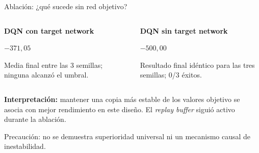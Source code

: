 \documentclass[aspectratio=169,10pt,t]{beamer}
\begin{document}
\begin{frame}{Ablación: ¿qué sucede sin red objetivo?}
\begin{columns}[T,onlytextwidth]
\begin{info}
\textbf{DQN con target network}\par\vspace{.13cm}
{\centering\color{Blue}\fontsize{27}{30}\selectfont\bfseries $-371{,}05$\par}
\vspace{.06cm}
\small Media final entre las 3 semillas; ninguna alcanzó el umbral.
\end{info}
\begin{info}
\textbf{DQN sin target network}\par\vspace{.13cm}
{\centering\color{Warn}\fontsize{27}{30}\selectfont\bfseries $-500{,}00$\par}
\vspace{.06cm}
\small Resultado final idéntico para las tres semillas; 0/3 éxitos.
\end{info}
\end{columns}
\vspace{.15cm}
\begin{takeaway}
\textbf{Interpretación:} mantener una copia más estable de los valores objetivo se asocia con mejor rendimiento en este diseño. El \emph{replay buffer} siguió activo durante la ablación.
\end{takeaway}
\vspace{.09cm}
{\footnotesize\color{Muted} Precaución: no se demuestra superioridad universal ni un mecanismo causal de inestabilidad.}
\end{frame}
\end{document}
